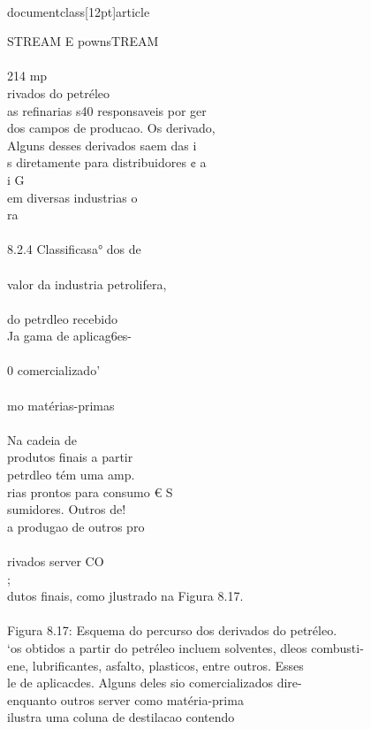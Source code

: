 \\documentclass[12pt]{article}
\begin{document}
{{STREAM E pownsTREAM\\
\\
214 mp\\
rivados do petréleo\\
as refinarias s40 responsaveis por ger\\
dos campos de producao. Os derivado, \\%
Alguns desses derivados saem das i\\
s diretamente para distribuidores ¢ a\\
i G\\
em diversas industrias o\\
ra\\
\\
8.2.4 Classificasa° dos de\\
\\
valor da industria petrolifera,\\
\\
do petrdleo recebido\\
Ja gama de aplicag6es-\\
\\
0 comercializado’\\
\\
mo matérias-primas\\
\\
Na cadeia de\\
produtos finais a partir\\
petrdleo tém uma amp.\\
rias prontos para consumo € S\\
sumidores. Outros de!\\
a produgao de outros pro\\
\\
rivados server CO\\} ;\\
dutos finais, como jlustrado na Figura 8.17.\\
\\
Figura 8.17: Esquema do percurso dos derivados do petréleo.\\
‘os obtidos a partir do petréleo incluem solventes, dleos combusti-\\
ene, lubrificantes, asfalto, plasticos, entre outros. Esses\\
le de aplicacdes. Alguns deles sio comercializados dire-\\
enquanto outros server como matéria-prima\\
ilustra uma coluna de destilacao contendo\\
}
\end{document}
